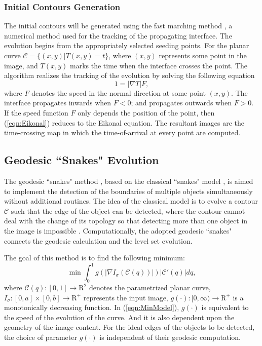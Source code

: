 \subsubsection{Initial Contours Generation}

The initial contours will be generated using the fast marching method \cite{Sethian1999}, a numerical method used for the tracking of the propagating interface.
The evolution begins from the appropriately selected seeding points.
For the planar curve $\mathcal{C} = \{(x,y) | T(x,y) = t\}$,
where $(x,y)$ represents some point in the image, and $T(x,y)$ marks the time when the interface crosses the point.
The algorithm realizes the tracking of the evolution by solving the following equation
\begin{equation}
\label{eqn:Eikonal}
1 = | \nabla T | F,
\end{equation}
where $F$ denotes the speed in the normal direction at some point $(x,y)$.
The interface propagates inwards when $F < 0$; and propagates outwards when $F > 0$.
If the speed function $F$ only depends the position of the point, then (\ref{eqn:Eikonal}) reduces to the Eikonal equation.
The resultant images are the time-crossing map in which the time-of-arrival at every point are computed.

\subsection{Geodesic ``Snakes" Evolution}

The geodesic ``snakes" method \cite{Caselles1997}, based on the classical ``snakes" model \cite{Kass1988}, is aimed to implement the detection of the boundaries of multiple objects simultaneously without additional routines. %
The idea of the classical model is to evolve a contour $\mathcal{C}$ such that the edge of the object can be detected, where the contour cannot deal with the change of its topology so that detecting more than one object in the image is impossible \cite{Caselles1997}. %
Computationally, the adopted geodesic ``snakes" connects the geodesic calculation and the level set evolution.

The goal of this method is to find the following minimum:
\begin{equation}
\label{eqn:MinModel}
\min \int_0^1 g(|\nabla I_{\sigma} ( \mathcal{C} (q) )|) |\mathcal{C}' (q)| dq,
\end{equation}
where $\mathcal{C}(q):[0,1]\rightarrow \mathrm{R}^2$ denotes the parametrized planar curve, $I_{\sigma}:[0,a]\times [0,b]\rightarrow \mathrm{R}^{+}$ represents the input image, $g(\cdot): [0, \infty) \rightarrow \mathrm{R}^{+}$ is a monotonically decreasing function. %
In (\ref{eqn:MinModel}), $g(\cdot)$ is equivalent to the speed of the evolution of the curve.
And it is also dependent upon the geometry of the image content.
For the ideal edges of the objects to be detected, the choice of parameter $g(\cdot)$ is independent of their geodesic computation.

